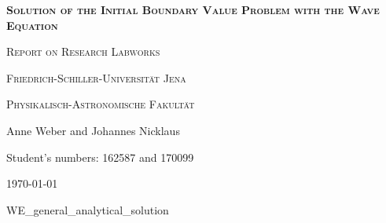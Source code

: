 \documentclass[a4paper,headsepline,12pt,oneside]{scrartcl}
\begin{document}
\begin{titlepage}
	\centering

	{\scshape\Large \textbf{Solution of the Initial Boundary Value Problem with the Wave Equation} \par}
	\vspace{1cm}
	{\scshape\Large Report on Research Labworks \par}
	\vspace{1.5cm}
	{\huge\bfseries \par}
	\vspace{2cm}
	{\scshape\large Friedrich-Schiller-Universität Jena\par}
	{\scshape\large Physikalisch-Astronomische Fakultät\par}
	\vfill
	{\Large Anne Weber and Johannes Nicklaus\par}
	\vfill
	{Student's numbers: 162587 and 170099\par}

	\vfill

	{\large \today\par}
\end{titlepage}


\newpage
\setcounter{page}{0}
\tableofcontents
\clearpage
\setcounter{page}{1}

{WE_general_analytical_solution}

\clearpage



\clearpage

\clearpage

\clearpage
\end{document}
